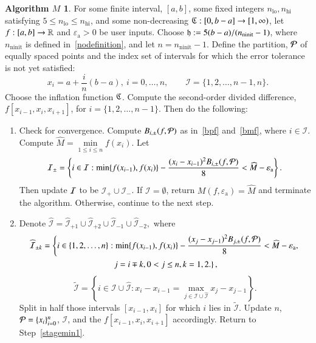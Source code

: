 \documentclass[review]{elsarticle}
\newcommand{\abstol}{\varepsilon_{\textrm{a}}}
\theoremstyle{definition}
\newtheorem*{algoM}{Algorithm $M$}
\DeclareMathOperator{\lo}{lo}
\DeclareMathOperator{\ninit}{ninit}
\newcommand{\minfi}{\min\limits_{1\le i \le n} f(x_i)} %
\newcommand{\minfii}{\min\{f(x_{i-1}), f(x_i)\}} %
\begin{document}
\begin{algoM} \label{AlgoM}
	For some finite interval, $[a,b]$, some fixed integers $n_{\lo}, n_{\text{hi}}$ satisfying $5 \le n_{\lo} \le n_{\text{hi}}$, and some non-decreasing
	$\mathfrak{C}:[0,b-a] \to [1, \infty)$, let $f:[a,b] \to \mathbb{R}$ and $\abstol >0$ be
	user inputs. Choose $\fh := 5(b-a)/(n_{\ninit}-1)$, where $n_{\ninit}$ is defined in~\eqref{nodefinition}, and let  $n=n_{\ninit}-1$.
	Define the partition, $\mathcal{P}$ of  equally spaced points and the index set of intervals for which the error tolerance
	is not yet satisfied:
	$$x_i=a+\frac{i}{n}(b-a), \ i=0,\ldots,n, \qquad
	\mathcal{I} = \{1,2,\ldots,n-1,n\}.$$
	Choose the inflation function $\mathfrak{C}$. Compute the second-order divided difference, $f[x_{i-1},x_{i}, x_{i+1}]$, for $i = \{1,2,\ldots,n-1\}$. Then do the following:
	\begin{enumerate}[\bf Step 1.]%
		\item \label{stagemin1} Check for convergence.
		Compute $B_{i,\pm}(f,\mathcal{P})$ as in~\eqref{bpf} and~\eqref{bmf}, where $i \in \mathcal{I}$. Compute $\widehat{M} = \minfi$.
		Let
		\[
		\mathcal{I}_\pm = \left\{i \in \mathcal{I}: \minfii -\frac{(x_i - x_{i-1})^2B_{i,\pm}(f,\cp)}{8}  < \widehat{M}-\abstol \right\}.
		\]
		Then update $\mathcal{I}$ to be $\mathcal{I}_+ \cup \mathcal{I}_-$.  If $\mathcal{I} = \emptyset$, return $M(f,\abstol) = \widehat{M}$ and terminate the algorithm.
		Otherwise, continue to the next step.
		\item \label{stagemin2}
		Denote $\widehat{\mathcal{I}}=\widehat{\mathcal{I}}_{+1} \cup \widehat{\mathcal{I}}_{+2} \cup \widehat{\mathcal{I}}_{-1} \cup \widehat{\mathcal{I}}_{-2},$ where
		\begin{multline*}
		\widehat{\mathcal{I}}_{\pm k} = \left\{i \in \{1,2,\ldots,n\}:  \minfii -\frac{(x_j - x_{j-1})^2B_{j,\pm}(f,\cp)}{8}  < \widehat{M}-\abstol,\right.\\
		\left.j=i\mp k, 0<j\le n, k=1,2. \right\},
		\end{multline*}
		\[\widetilde{\mathcal{I}}=\left\{i \in \mathcal{I} \cup \widehat{\mathcal{I}}: x_i - x_{i-1}=\max\limits_{j \in \mathcal{I} \cup \widehat{\mathcal{I}} } x_j-x_{j-1} \right\}.\]
		Split in half those intervals $[x_{i-1},x_i]$ for which $i$ lies in $\widetilde{\mathcal{I}}$.
		Update $n$, $\mathcal{P} = \{x_i\}_{i=0}^n$, $\mathcal{I}$, and the $f[x_{i-1}, x_{i}, x_{i+1}]$ accordingly.  Return to Step~\ref{stagemin1}.
	\end{enumerate}
\end{algoM}
\end{document}
